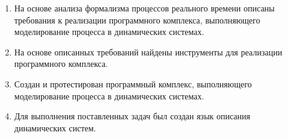 \begin{enumerate}
  \item На основе анализа формализма процессов реального времени описаны требования к реализации программного комплекса, выполняющего моделирование процесса в динамических системах.
  \item На основе описанных требований найдены инструменты для реализации программного комплекса.
  \item Создан и протестирован программный комплекс, выполняющего моделирование процесса в динамических системах.
  \item Для выполнения поставленных задач был создан язык описания динамических систем.
\end{enumerate}
